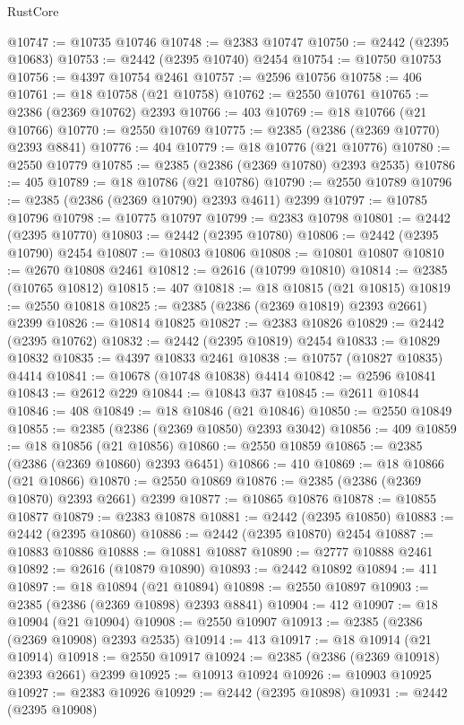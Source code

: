 \begin{lexlean}{RustCore}
\begin{coremodule}
@10747 := @10735 @10746
@10748 := @2383 @10747
@10750 := @2442 (@2395 @10683)
@10753 := @2442 (@2395 @10740) @2454
@10754 := @10750 @10753
@10756 := @4397 @10754 @2461
@10757 := @2596 @10756
@10758 := 406
@10761 := @18 @10758 (@21 @10758)
@10762 := @2550 @10761
@10765 := @2386 (@2369 @10762) @2393
@10766 := 403
@10769 := @18 @10766 (@21 @10766)
@10770 := @2550 @10769
@10775 := @2385 (@2386 (@2369 @10770) @2393 @8841)
@10776 := 404
@10779 := @18 @10776 (@21 @10776)
@10780 := @2550 @10779
@10785 := @2385 (@2386 (@2369 @10780) @2393 @2535)
@10786 := 405
@10789 := @18 @10786 (@21 @10786)
@10790 := @2550 @10789
@10796 := @2385 (@2386 (@2369 @10790) @2393 @4611) @2399
@10797 := @10785 @10796
@10798 := @10775 @10797
@10799 := @2383 @10798
@10801 := @2442 (@2395 @10770)
@10803 := @2442 (@2395 @10780)
@10806 := @2442 (@2395 @10790) @2454
@10807 := @10803 @10806
@10808 := @10801 @10807
@10810 := @2670 @10808 @2461
@10812 := @2616 (@10799 @10810)
@10814 := @2385 (@10765 @10812)
@10815 := 407
@10818 := @18 @10815 (@21 @10815)
@10819 := @2550 @10818
@10825 := @2385 (@2386 (@2369 @10819) @2393 @2661) @2399
@10826 := @10814 @10825
@10827 := @2383 @10826
@10829 := @2442 (@2395 @10762)
@10832 := @2442 (@2395 @10819) @2454
@10833 := @10829 @10832
@10835 := @4397 @10833 @2461
@10838 := @10757 (@10827 @10835) @4414
@10841 := @10678 (@10748 @10838) @4414
@10842 := @2596 @10841
@10843 := @2612 @229
@10844 := @10843 @37
@10845 := @2611 @10844
@10846 := 408
@10849 := @18 @10846 (@21 @10846)
@10850 := @2550 @10849
@10855 := @2385 (@2386 (@2369 @10850) @2393 @3042)
@10856 := 409
@10859 := @18 @10856 (@21 @10856)
@10860 := @2550 @10859
@10865 := @2385 (@2386 (@2369 @10860) @2393 @6451)
@10866 := 410
@10869 := @18 @10866 (@21 @10866)
@10870 := @2550 @10869
@10876 := @2385 (@2386 (@2369 @10870) @2393 @2661) @2399
@10877 := @10865 @10876
@10878 := @10855 @10877
@10879 := @2383 @10878
@10881 := @2442 (@2395 @10850)
@10883 := @2442 (@2395 @10860)
@10886 := @2442 (@2395 @10870) @2454
@10887 := @10883 @10886
@10888 := @10881 @10887
@10890 := @2777 @10888 @2461
@10892 := @2616 (@10879 @10890)
@10893 := @2442 @10892
@10894 := 411
@10897 := @18 @10894 (@21 @10894)
@10898 := @2550 @10897
@10903 := @2385 (@2386 (@2369 @10898) @2393 @8841)
@10904 := 412
@10907 := @18 @10904 (@21 @10904)
@10908 := @2550 @10907
@10913 := @2385 (@2386 (@2369 @10908) @2393 @2535)
@10914 := 413
@10917 := @18 @10914 (@21 @10914)
@10918 := @2550 @10917
@10924 := @2385 (@2386 (@2369 @10918) @2393 @2661) @2399
@10925 := @10913 @10924
@10926 := @10903 @10925
@10927 := @2383 @10926
@10929 := @2442 (@2395 @10898)
@10931 := @2442 (@2395 @10908)

\end{coremodule}
\end{lexlean}
